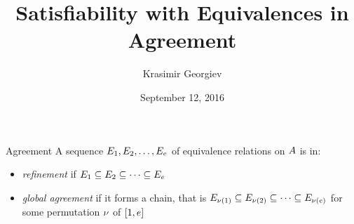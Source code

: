 \documentclass{beamer}
\begin{document}
\title{Satisfiability with Equivalences in Agreement}
\author{Krasimir Georgiev}
\date{September 12, 2016}
\frame{\titlepage}

\begin{frame}{Agreement}
A sequence $E_{1},E_{2},\dots,E_{e}$ of equivalence relations on
$A$ is in:
\begin{itemize}
  \item\alert<+>{\emph{refinement} if
  $E_{1}\subseteq E_{2}\subseteq\dots\subseteq E_{e}$}
  
  \item\alert<+>{\emph{global agreement} if it forms a chain, that is
  $E_{\nu(1)}\subseteq E_{\nu(2)}\subseteq\dots\subseteq E_{\nu(e)}$
  for some permutation $\nu$ of $[1,e]$}
  

\end{itemize}
\end{frame}
\end{document}
